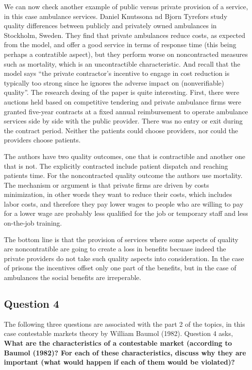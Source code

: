 \documentclass[11pt]{article} %
\begin{document}
We can now check another example of public versus private provision of a service, in this case ambulance services. Daniel Knutssona nd Bjorn Tyrefors study quality differences between publicly and privately owned ambulances in Stockholm, Sweden. They find that private ambulances reduce costs, as expected from the model, and offer a good service in terms of response time (this being perhaps a contratible aspect), but they perform worse on noncontracted measures such as mortality, which is an uncontractible characteristic. And recall that the model says ``the private contractor's incentive to engage in cost reduction is typically too strong since he ignores the adverse impact on (nonverifiable) quality''. The research desing of the paper is quite interesting. First, there were auctions held based on competitive tendering and private ambulance firms were granted five-year contracts at a fixed annual reimbursement to operate ambulance services side by side with the public provider. There was no entry or exit  during the contract period. Neither the patients could choose providers, nor could the providers choose patients. 

The authors have two quality outcomes, one that is contractible and another one that is not. The explicitly contracted include patient dispatch and reaching patients time. For the noncontracted quality outcome the authors use mortality. The mechanism or argument is that private firms are driven by costs minimization, in other words they want to reduce their costs, which includes labor costs, and therefore they pay lower wages to people who are willing to pay for a lower wage are probably less qualified for the job or temporary staff and less on-the-job training.

The bottom line is that the provision of services where some aspects of quality are noncontratible are going to create a loss in benefits becuase indeed the private providers do not take such quality aspects into consideration. In the case of prisons the incentives offset only one part of the benefits, but in the case of ambulances the social benefits are irreperable.

\subsection{Question 4}

The following three questions are associated with the part 2 of the topics, in this case contestable markets theory by William Baumol (1982). Question 4 asks, \textbf{What are the characteristics of a contestable market (according to Baumol (1982)? For each of these characteristics, discuss why they are important (what would happen if each of them would be violated)?}
\end{document}
